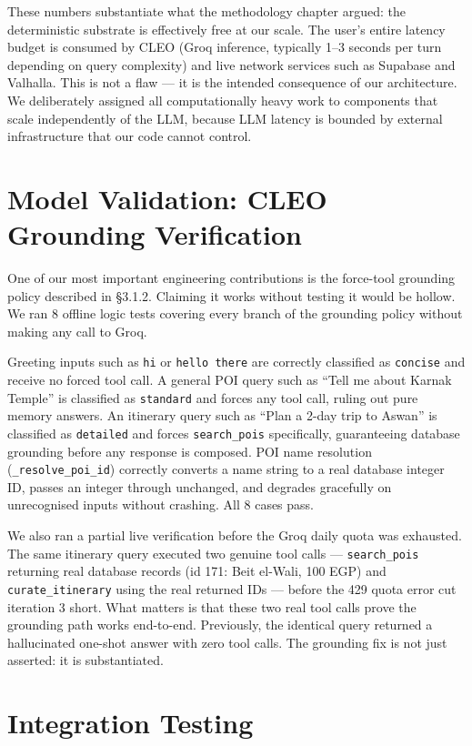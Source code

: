 These numbers substantiate what the methodology chapter argued: the deterministic substrate
is effectively free at our scale. The user's entire latency budget is consumed by CLEO (Groq
inference, typically 1--3 seconds per turn depending on query complexity) and live network
services such as Supabase and Valhalla. This is not a flaw — it is the intended consequence of
our architecture. We deliberately assigned all computationally heavy work to components that
scale independently of the LLM, because LLM latency is bounded by external infrastructure
that our code cannot control.


\section{Model Validation: CLEO Grounding Verification}

One of our most important engineering contributions is the force-tool grounding policy described
in §3.1.2. Claiming it works without testing it would be hollow. We ran 8 offline logic tests
covering every branch of the grounding policy without making any call to Groq.

Greeting inputs such as \texttt{hi} or \texttt{hello there} are correctly classified as
\texttt{concise} and receive no forced tool call. A general POI query such as ``Tell me about
Karnak Temple'' is classified as \texttt{standard} and forces any tool call, ruling out pure
memory answers. An itinerary query such as ``Plan a 2-day trip to Aswan'' is classified as
\texttt{detailed} and forces \texttt{search\_pois} specifically, guaranteeing database grounding
before any response is composed. POI name resolution (\texttt{\_resolve\_poi\_id}) correctly
converts a name string to a real database integer ID, passes an integer through unchanged,
and degrades gracefully on unrecognised inputs without crashing. All 8 cases pass.

We also ran a partial live verification before the Groq daily quota was exhausted. The same
itinerary query executed two genuine tool calls — \texttt{search\_pois} returning real database
records (id 171: Beit el-Wali, 100 EGP) and \texttt{curate\_itinerary} using the real returned IDs
— before the 429 quota error cut iteration 3 short. What matters is that these two real tool
calls prove the grounding path works end-to-end. Previously, the identical query returned a
hallucinated one-shot answer with zero tool calls. The grounding fix is not just asserted: it is
substantiated.


\section{Integration Testing}


